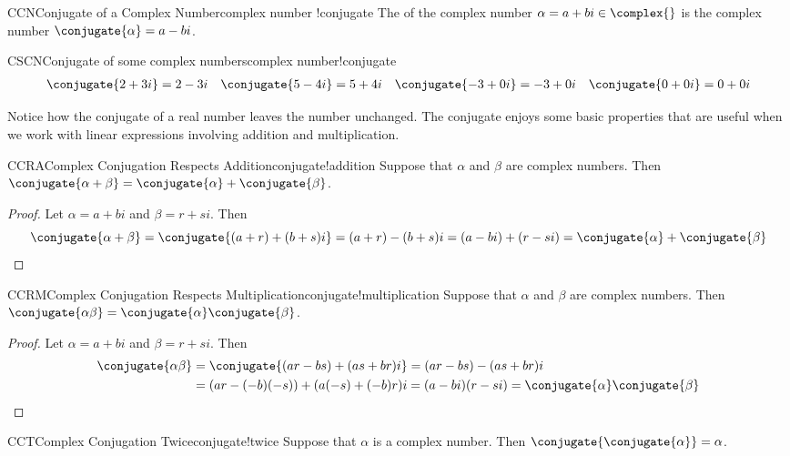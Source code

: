 %
\begin{definition}{CCN}{Conjugate of a Complex Number}{complex number !conjugate}
The  of the complex number $\alpha=a+bi\in\complex{\null}$  is the complex number $\conjugate{\alpha}=a-bi$.
\end{definition}
%
\begin{example}{CSCN}{Conjugate of some complex numbers}{complex number!conjugate}
%
\begin{align*}
\conjugate{2+3i}=2-3i&&\conjugate{5-4i}=5+4i&&
\conjugate{-3+0i}=-3+0i&&\conjugate{0+0i}=0+0i
\end{align*}
%
\end{example}
%
Notice how the conjugate of a real number leaves the number unchanged.  The conjugate enjoys some basic properties that are useful when we work with linear expressions involving addition and multiplication.
%
\begin{theorem}{CCRA}{Complex Conjugation Respects Addition}{conjugate!addition}
Suppose that $\alpha$ and $\beta$ are complex numbers.  Then $\conjugate{\alpha+\beta}=\conjugate{\alpha}+\conjugate{\beta}$.
\end{theorem}
%
\begin{proof}
Let $\alpha=a+bi$ and $\beta=r+si$.  Then
%
\begin{equation*}
\conjugate{\alpha+\beta}=\conjugate{(a+r)+(b+s)i}=(a+r)-(b+s)i=(a-bi)+(r-si)=\conjugate{\alpha}+\conjugate{\beta}
\end{equation*}
%
\end{proof}
%
\begin{theorem}{CCRM}{Complex Conjugation Respects Multiplication}{conjugate!multiplication}
Suppose that $\alpha$ and $\beta$ are complex numbers.  Then $\conjugate{\alpha\beta}=\conjugate{\alpha}\conjugate{\beta}$.
\end{theorem}
%
\begin{proof}
Let $\alpha=a+bi$ and $\beta=r+si$.  Then
%
\begin{align*}
\conjugate{\alpha\beta}&=\conjugate{(ar-bs)+(as+br)i}=(ar-bs)-(as+br)i\\
&=(ar-(-b)(-s))+(a(-s)+(-b)r)i=(a-bi)(r-si)=\conjugate{\alpha}\conjugate{\beta}
\end{align*}
%
\end{proof}
%
\begin{theorem}{CCT}{Complex Conjugation Twice}{conjugate!twice}
Suppose that $\alpha$ is a complex number.  Then $\conjugate{\conjugate{\alpha}}=\alpha$.
\end{theorem}
